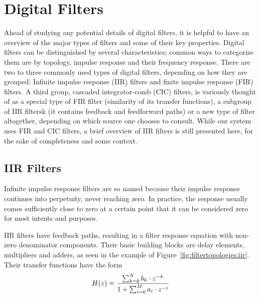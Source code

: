 %
%
\section{Digital Filters}%
\label{sec:digital_filters}

Ahead of studying  any potential details of digital filters,  it is helpful to
have  an  overview of  the  major  types of  filters  and  some of  their  key
properties.  Digital filters can  be distinguished by several characteristics;
common ways  to categorize them  are by  topology, impulse response  and their
frequency  response. There are  two to  three commonly  used types  of digital
filters, depending  on how they  are grouped: Infinite impulse  response (IIR)
filters and  finite impulse  response (FIR)  filters. A third  group, cascaded
integrator-comb (CIC)  filters, is variously thought  of as a special  type of
FIR filter (similarity of its transfer  functions), a subgroup of IIR filtersk
(it  contains  feedback  and  feedforward  paths) or  a  new  type  of  filter
altogether,  depending on  which source  one  chooses to  consult.  While  our
system uses  FIR and  CIC filters, a  brief overview of  IIR filters  is still
presented here, for the sake of completeness and some context.


%
%
\subsection{IIR Filters} %
\label{subsec:iir_filters}

Infinite impulse response filters are  so named because their impulse response
continues  into perpetuity,  never  reaching zero. In  practice, the  response
usually comes  sufficiently close to  zero at a certain  point that it  can be
considered zero for most intents and purposes.

IIR  filters have  feedback paths,  resulting  in a  filter response  equation
with  non-zero   denominator  components. Their  basic  building   blocks  are
delay  elements,   multipliers  and  adders,   as  seen  in  the   example  of
Figure~\ref{fig:filtertopologies:iir}. Their transfer functions have the form
\begin{equation}
    \label{eq:iir_filter}
    H(z) = \frac{%
            \sum_{k=0}^N b_k \cdot z^{-k}}{%
            1 + \sum_{i=0}^M a_i \cdot z^{-i}}
\end{equation}


